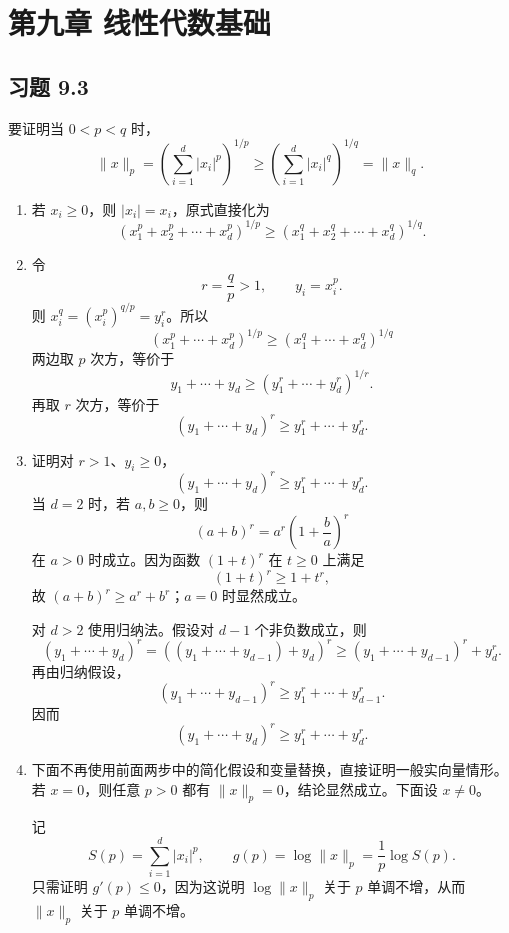 \documentclass[UTF8,a4paper,12pt]{ctexart}
\begin{document}
\section*{第九章 线性代数基础}

\subsection*{习题 9.3}

要证明当 $0<p<q$ 时，
\[
    \|x\|_p
    =
    \left(\sum_{i=1}^d |x_i|^p\right)^{1/p}
    \ge
    \left(\sum_{i=1}^d |x_i|^q\right)^{1/q}
    =
    \|x\|_q.
\]

\begin{enumerate}
  \item 若 $x_i\ge0$，则 $|x_i|=x_i$，原式直接化为
  \[
      (x_1^p+x_2^p+\cdots+x_d^p)^{1/p}
      \ge
      (x_1^q+x_2^q+\cdots+x_d^q)^{1/q}.
  \]

  \item 令
  \[
      r=\frac{q}{p}>1,\qquad y_i=x_i^p.
  \]
  则 $x_i^q=(x_i^p)^{q/p}=y_i^r$。所以
  \[
      (x_1^p+\cdots+x_d^p)^{1/p}
      \ge
      (x_1^q+\cdots+x_d^q)^{1/q}
  \]
  两边取 $p$ 次方，等价于
  \[
      y_1+\cdots+y_d
      \ge
      (y_1^r+\cdots+y_d^r)^{1/r}.
  \]
  再取 $r$ 次方，等价于
  \[
      (y_1+\cdots+y_d)^r
      \ge
      y_1^r+\cdots+y_d^r.
  \]

  \item 证明对 $r>1$、$y_i\ge0$，
  \[
      (y_1+\cdots+y_d)^r\ge y_1^r+\cdots+y_d^r.
  \]
  当 $d=2$ 时，若 $a,b\ge0$，则
  \[
      (a+b)^r=a^r\left(1+\frac{b}{a}\right)^r
  \]
  在 $a>0$ 时成立。因为函数 $(1+t)^r$ 在 $t\ge0$ 上满足
  \[
      (1+t)^r\ge 1+t^r,
  \]
  故 $(a+b)^r\ge a^r+b^r$；$a=0$ 时显然成立。

  对 $d>2$ 使用归纳法。假设对 $d-1$ 个非负数成立，则
  \[
      (y_1+\cdots+y_d)^r
      =
      ((y_1+\cdots+y_{d-1})+y_d)^r
      \ge
      (y_1+\cdots+y_{d-1})^r+y_d^r.
  \]
  再由归纳假设，
  \[
      (y_1+\cdots+y_{d-1})^r
      \ge y_1^r+\cdots+y_{d-1}^r.
  \]
  因而
  \[
      (y_1+\cdots+y_d)^r
      \ge y_1^r+\cdots+y_d^r.
  \]

  \item 下面不再使用前面两步中的简化假设和变量替换，直接证明一般实向量情形。若 $x=0$，则任意 $p>0$ 都有 $\|x\|_p=0$，结论显然成立。下面设 $x\ne0$。

  记
  \[
      S(p)=\sum_{i=1}^d |x_i|^p,\qquad
      g(p)=\log\|x\|_p=\frac{1}{p}\log S(p).
  \]
  只需证明 $g'(p)\le0$，因为这说明 $\log\|x\|_p$ 关于 $p$ 单调不增，从而 $\|x\|_p$ 关于 $p$ 单调不增。


\end{enumerate}
\end{document}
